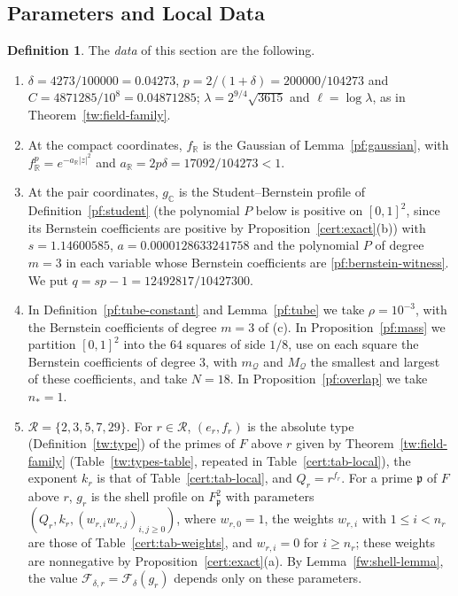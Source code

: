 \documentclass[11pt]{amsart}
\numberwithin{equation}{section}
\theoremstyle{definition}
\newtheorem{definition}[equation]{Definition}
\theoremstyle{remark}
\newcommand{\R}{\mathbb R}
\newcommand{\C}{\mathbb C}
\newcommand{\deltastar}{0.04273}
\newcommand{\ceiling}{0.04871285}
\begin{document}
\subsection{Parameters and Local Data}

\begin{definition}\label{cert:data}
The \emph{data} of this section are the following.
\begin{enumerate}
\item[(a)] $\delta=4273/100000=\deltastar$, $p=2/(1+\delta)=200000/104273$
and $C=4871285/10^8=\ceiling$; $\lambda=2^{9/4}\sqrt{3615}$ and
$\ell=\log\lambda$, as in Theorem~\ref{tw:field-family}.
\item[(b)] At the compact coordinates, $f_\R$ is the Gaussian of
Lemma~\ref{pf:gaussian}, with $f_\R^p=e^{-a_\R|z|^2}$ and
$a_\R=2p\delta=17092/104273<1$.
\item[(c)] At the pair coordinates, $g_\C$ is the Student--Bernstein
profile of Definition~\ref{pf:student} (the polynomial $P$ below is
positive on $[0,1]^2$, since its Bernstein coefficients are positive by
Proposition~\ref{cert:exact}(b)) with $s=1.14600585$,
$a=0.0000128633241758$ and the polynomial $P$ of degree $m=3$ in each
variable whose Bernstein coefficients are \eqref{pf:bernstein-witness}.
We put $q=sp-1=12492817/10427300$.
\item[(d)] In Definition~\ref{pf:tube-constant} and Lemma~\ref{pf:tube}
we take $\rho=10^{-3}$, with the Bernstein coefficients of degree $m=3$
of (c). In Proposition~\ref{pf:mass} we partition $[0,1]^2$ into the
$64$ squares of side $1/8$, use on each square the Bernstein
coefficients of degree $3$, with $m_{\mathcal Q}$ and $M_{\mathcal Q}$
the smallest and largest of these coefficients, and take $N=18$. In
Proposition~\ref{pf:overlap} we take $n_*=1$.
\item[(e)] $\mathcal R=\{2,3,5,7,29\}$. For $r\in\mathcal R$, $(e_r,f_r)$
is the absolute type (Definition~\ref{tw:type}) of the primes of $F$
above $r$ given by Theorem~\ref{tw:field-family}
(Table~\ref{tw:types-table}, repeated in Table~\ref{cert:tab-local}),
the exponent $k_r$ is that of Table~\ref{cert:tab-local}, and
$Q_r=r^{f_r}$. For a prime $\mathfrak p$ of $F$ above $r$, $g_r$ is the
shell profile on $F_{\mathfrak p}^2$ with parameters
$(Q_r,k_r,(w_{r,i}w_{r,j})_{i,j\ge0})$, where $w_{r,0}=1$, the weights
$w_{r,i}$ with $1\le i<n_r$ are those of Table~\ref{cert:tab-weights},
and $w_{r,i}=0$ for $i\ge n_r$; these weights are nonnegative by
Proposition~\ref{cert:exact}(a). By Lemma~\ref{fw:shell-lemma}, the
value $\mathcal F_{\delta,r}=\mathcal F_\delta(g_r)$ depends only on these
parameters.
\end{enumerate}
\end{definition}
\end{document}
